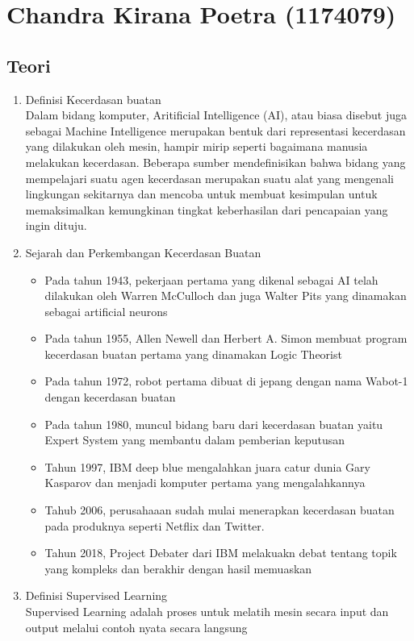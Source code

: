 \section{Chandra Kirana Poetra (1174079)}
\subsection{Teori}
\begin{enumerate}
\item Definisi Kecerdasan buatan\\ 
Dalam bidang komputer, Aritificial Intelligence (AI), atau biasa disebut juga sebagai Machine Intelligence merupakan bentuk dari representasi kecerdasan yang dilakukan oleh mesin, hampir mirip seperti bagaimana manusia melakukan kecerdasan. Beberapa sumber mendefinisikan  bahwa bidang yang mempelajari suatu agen kecerdasan merupakan suatu alat yang mengenali lingkungan sekitarnya dan mencoba untuk membuat kesimpulan untuk memaksimalkan kemungkinan tingkat keberhasilan dari pencapaian yang ingin dituju.

\item Sejarah dan Perkembangan Kecerdasan Buatan
\begin{itemize}
\item Pada tahun 1943, pekerjaan pertama yang dikenal sebagai AI telah dilakukan oleh Warren McCulloch dan juga Walter Pits yang dinamakan sebagai artificial neurons
\item Pada tahun 1955, Allen Newell dan Herbert A. Simon membuat program kecerdasan buatan pertama yang dinamakan Logic Theorist
\item Pada tahun 1972, robot pertama dibuat di jepang dengan nama Wabot-1 dengan kecerdasan buatan
\item Pada tahun 1980, muncul bidang baru dari kecerdasan buatan yaitu Expert System yang membantu dalam pemberian keputusan
\item Tahun 1997, IBM deep blue mengalahkan juara catur dunia Gary Kasparov dan menjadi komputer pertama yang mengalahkannya
\item Tahub 2006, perusahaaan sudah mulai menerapkan kecerdasan buatan pada produknya seperti Netflix dan Twitter.
\item Tahun 2018,  	Project Debater dari IBM melakuakn debat tentang topik yang kompleks dan berakhir dengan hasil memuaskan
\end{itemize}

\item Definisi Supervised Learning\\
Supervised Learning adalah proses untuk melatih mesin secara input dan output melalui contoh nyata secara langsung


\end{enumerate}
